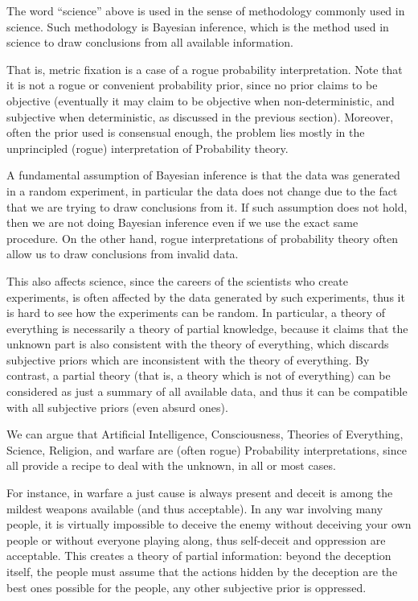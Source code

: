 \documentclass[11pt]{book}
\begin{document}
The word ``science'' above is used in the sense of methodology commonly
used in science. Such methodology is Bayesian inference, which is the
method used in science to draw conclusions from all available
information.

That is, metric fixation is a case of a rogue probability
interpretation. Note that it is not a rogue or convenient probability
prior, since no prior claims to be objective (eventually it may claim to
be objective when non-deterministic, and subjective when deterministic,
as discussed in the previous section). Moreover, often the prior used is
consensual enough, the problem lies mostly in the unprincipled (rogue)
interpretation of Probability theory.

A fundamental assumption of Bayesian inference is that the data was
generated in a random experiment, in particular the data does not change
due to the fact that we are trying to draw conclusions from it. If such
assumption does not hold, then we are not doing Bayesian inference even
if we use the exact same procedure. On the other hand, rogue
interpretations of probability theory often allow us to draw conclusions
from invalid data.

This also affects science, since the careers of the scientists who
create experiments, is often affected by the data generated by such
experiments, thus it is hard to see how the experiments can be random.
In particular, a theory of everything is necessarily a theory of partial
knowledge, because it claims that the unknown part is also consistent
with the theory of everything, which discards subjective priors which
are inconsistent with the theory of everything. By contrast, a partial
theory (that is, a theory which is not of everything) can be considered
as just a summary of all available data, and thus it can be compatible
with all subjective priors (even absurd ones).

We can argue that Artificial Intelligence, Consciousness, Theories of
Everything, Science, Religion, and warfare are (often rogue) Probability
interpretations, since all provide a recipe to deal with the unknown, in
all or most cases.

For instance, in warfare a just cause is always present and deceit is
among the mildest weapons available (and thus acceptable). In any war
involving many people, it is virtually impossible to deceive the enemy
without deceiving your own people or without everyone playing along,
thus self-deceit and oppression are acceptable. This creates a theory of
partial information: beyond the deception itself, the people must assume
that the actions hidden by the deception are the best ones possible for
the people, any other subjective prior is oppressed.
\end{document}

